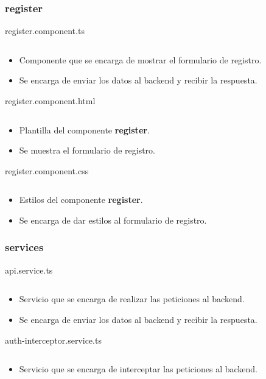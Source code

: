 \documentclass{article}
\newenvironment{block}{\captionsetup{type=listing}}{}
\begin{document}
\subsubsection{register}
\begin{block}
	\caption{register.component.ts}
	\inputminted{TypeScript}{kioskios_web/src/app/register/register.component.ts}
	\begin{itemize}
		\item Componente que se encarga de mostrar el formulario de registro.
		\item Se encarga de enviar los datos al backend y recibir la respuesta.
	\end{itemize}

	\caption{register.component.html}
	\inputminted{HTML}{kioskios_web/src/app/register/register.component.html}
	\begin{itemize}
		\item Plantilla del componente \textbf{register}.
		\item Se muestra el formulario de registro.
	\end{itemize}

	\caption{register.component.css}
	\inputminted{CSS}{kioskios_web/src/app/register/register.component.css}
	\begin{itemize}
		\item Estilos del componente \textbf{register}.
		\item Se encarga de dar estilos al formulario de registro.
	\end{itemize}
\end{block}

\subsubsection{services}
\begin{block}
	\caption{api.service.ts}
	\inputminted{TypeScript}{kioskios_web/src/app/services/api.service.ts}
	\begin{itemize}
		\item Servicio que se encarga de realizar las peticiones al backend.
		\item Se encarga de enviar los datos al backend y recibir la respuesta.
	\end{itemize}

	\caption{auth-interceptor.service.ts}
	\inputminted[breaklines]{TypeScript}{kioskios_web/src/app/services/auth-interceptor.service.ts}
	\begin{itemize}
		\item Servicio que se encarga de interceptar las peticiones al backend.
	\end{itemize}
\end{block}
\end{document}
